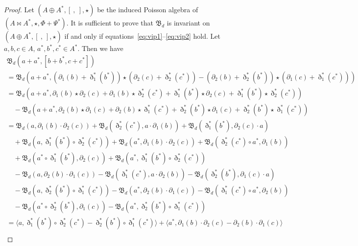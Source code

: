 \documentclass[pdftex]{sigma}
\numberwithin{equation}{section}
\begin{document}
\begin{proof} Let $(A \oplus A^*, [\ ,\ ], \star)$ be the induced Poisson algebra of $(A \bowtie A^*, \star, \Phi + \Psi^*)$.
 It is sufficient to prove that
 $\mathfrak{B}_d$ is invariant on $(A \oplus A^*, [\ ,\ ], \star)$
 if and only if equations~\eqref{eq:vip1}--\eqref{eq:vip2} hold.
 Let $a, b, c \in A$, $a^*, b^*, c^* \in A^*$.
 Then we have
 \begin{gather*}
 \mathfrak{B}_d(a + a^*, [b + b^*, c + c^*]) \\
 = \mathfrak{B}_d(a + a^*, (\partial_1(b)+\eth_1^{*}(b^*))\star(\partial_2(c)+\eth_2^{*}(c^*)) - (\partial_2(b)+\eth_2^{*}(b^*))\star(\partial_1(c)+\eth_1^{*}(c^*))) \\
 =\mathfrak{B}_d(a + a^*, \partial_1(b) \star \partial_2(c) + \partial_1(b) \star \eth_2^{*}(c^*) + \eth_1^{*}(b^*) \star \partial_2(c) + \eth_1^{*}(b^*) \star \eth_2^{*}(c^*))\\
 \quad {}- \mathfrak{B}_d(a + a^*, \partial_2(b) \star \partial_1(c) + \partial_2(b) \star \eth_1^{*}(c^*) + \eth_2^{*}(b^*) \star \partial_1(c) + \eth_2^{*}(b^*) \star \eth_1^{*}(c^*)) \\
 = \mathfrak{B}_d(a, \partial_1(b) \cdot \partial_2(c)) + \mathfrak{B}_d( \eth_2^{*}(c^*), a \cdot \partial_1(b)) + \mathfrak{B}_d( \eth_1^{*}(b^*), \partial_2(c) \cdot a) \\
 \quad {}+ \mathfrak{B}_d( a, \eth_1^{*}(b^*) \circ \eth_2^{*}(c^*)) + \mathfrak{B}_d( a^*, \partial_1(b) \cdot \partial_2(c) ) + \mathfrak{B}_d(\eth_2^{*}(c^*) \circ a^*, \partial_1(b)) \\
 \quad {}+ \mathfrak{B}_d(a^* \circ \eth_1^{*}(b^*),\partial_2(c)) + \mathfrak{B}_d(a^*,\eth_1^{*}(b^*) \circ \eth_2^{*}(c^*)) \\
 \quad {}- \mathfrak{B}_d(a, \partial_2(b) \cdot \partial_1(c)) - \mathfrak{B}_d( \eth_1^{*}(c^*), a \cdot \partial_2(b)) - \mathfrak{B}_d( \eth_2^{*}(b^*), \partial_1(c) \cdot a) \\
 \quad {}- \mathfrak{B}_d( a, \eth_2^{*}(b^*) \circ \eth_1^{*}(c^*)) - \mathfrak{B}_d( a^*, \partial_2(b) \cdot \partial_1(c) ) - \mathfrak{B}_d(\eth_1^{*}(c^*) \circ a^*, \partial_2(b)) \\
 \quad {}- \mathfrak{B}_d(a^* \circ \eth_2^{*}(b^*),\partial_1(c)) - \mathfrak{B}_d(a^*,\eth_2^{*}(b^*) \circ \eth_1^{*}(c^*)) \\
 = \langle a, \eth_1^{*}(b^*) \circ \eth_2^{*}(c^*) - \eth_2^{*}(b^*) \circ \eth_1^{*}(c^*) \rangle + \langle a^*, \partial_1(b) \cdot \partial_2(c) - \partial_2(b) \cdot \partial_1(c) \rangle \\

\end{gather*}
\end{proof}
\end{document}
